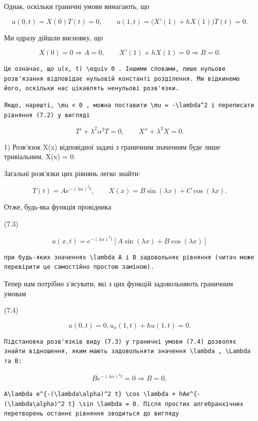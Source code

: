 \documentclass[
  ukrainian,
]{article}
\begin{document}
Однак, оскільки граничні умови вимагають, що

\[
u(0, t) = X(0) T(t) = 0, \qquad u(1,t)=\bigl(X'(1)+hX(1)\bigr)T(t)=0.
\]

Ми одразу дійшли висновку, що

\[
X(0)=0\Rightarrow A=0,\qquad X'(1)+hX(1)=0\Rightarrow B=0.
\]

\begin{verbatim}
Це означає, що u(x, t) \equiv 0 . Іншими словами, лише нульове розв'язання відповідає нульовій константі розділення. Ми відкинемо його, оскільки нас цікавлять ненульові розв'язки.
\end{verbatim}

\begin{verbatim}
Якщо, нарешті, \mu < 0 , можна поставити \mu = -\lambda^2 і переписати рівняння (7.2) у вигляді
\end{verbatim}

\[
T' + \lambda^2 \alpha^2 T = 0, \qquad X'' + \lambda^2 X = 0.
\]

1) Розв'язок X(x) відповідної задачі з граничним значенням буде лише
тривіальним, X(x) = 0.

Загальні розв'язки цих рівнянь легко знайти:

\[
T(t) = Ae^{-(\lambda \alpha)^2 t},
\qquad
X(x) = B\sin(\lambda x) + C\cos(\lambda x).
\]

Отже, будь-яка функція провідника

(7.3)

\[
u(x, t) = e^{-(\lambda \alpha)^2 t} [A \sin(\lambda x) + B \cos(\lambda x)]
\]

\begin{verbatim}
при будь-яких значеннях \lambda A і B задовольняє рівняння (читач може перевірити це самостійно простою заміною).
\end{verbatim}

Тепер нам потрібно з'ясувати, які з цих функцій задовольняють граничним
умовам

(7.4)

\[
u(0, t) = 0, u_x(1, t) + hu(1, t) = 0.
\]

\begin{verbatim}
Підстановка розв'язків виду (7.3) у граничні умови (7.4) дозволяє знайти відношення, яким мають задовольняти значення \lambda , \Lambda та B:
\end{verbatim}

\[
Be^{-(\lambda\alpha)^2 t} = 0 \Rightarrow B = 0,
\]

\begin{verbatim}
A\lambda e^{-(\lambda\alpha)^2 t} \cos \lambda + hAe^{-(\lambda\alpha)^2 t} \sin \lambda = 0. Після простих алгебранхічних перетворень останнє рівняння зводиться до вигляду
\end{verbatim}
\end{document}
